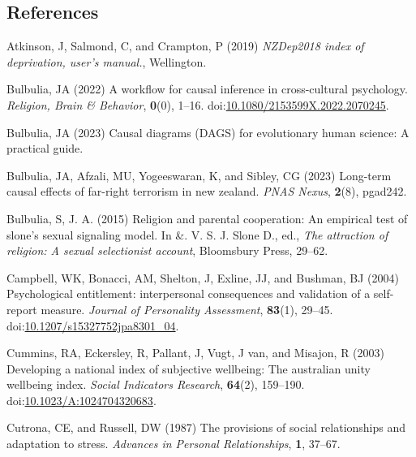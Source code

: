 \documentclass[
  singlecolumn,
  9pt]{article}
\newlength{\cslhangindent}
\newenvironment{CSLReferences}[2] %
 {\begin{list}{}{%
  \setlength{\itemindent}{0pt}
  \setlength{\leftmargin}{0pt}
  \setlength{\parsep}{0pt}
  \ifodd #1
   \setlength{\leftmargin}{\cslhangindent}
   \setlength{\itemindent}{-1\cslhangindent}
  \fi
  \setlength{\itemsep}{#2\baselineskip}}}
 {\end{list}}
\begin{document}
\newpage{}

\subsection*{References}\label{references}

\label{refs}
\begin{CSLReferences}{1}{0}
Atkinson, J, Salmond, C, and Crampton, P (2019) \emph{NZDep2018 index of
deprivation, user{'}s manual.}, Wellington.

Bulbulia, JA (2022) A workflow for causal inference in cross-cultural
psychology. \emph{Religion, Brain \& Behavior}, \textbf{0}(0), 1--16.
doi:\href{https://doi.org/10.1080/2153599X.2022.2070245}{10.1080/2153599X.2022.2070245}.

Bulbulia, JA (2023) Causal diagrams (DAGS) for evolutionary human
science: A practical guide.

Bulbulia, JA, Afzali, MU, Yogeeswaran, K, and Sibley, CG (2023)
Long-term causal effects of far-right terrorism in new zealand.
\emph{PNAS Nexus}, \textbf{2}(8), pgad242.

Bulbulia, S, J. A. (2015) Religion and parental cooperation: An
empirical test of slone's sexual signaling model. In \&. V. S. J. Slone
D., ed., \emph{The attraction of religion: A sexual selectionist
account}, Bloomsbury Press, 29--62.

Campbell, WK, Bonacci, AM, Shelton, J, Exline, JJ, and Bushman, BJ
(2004) Psychological entitlement: interpersonal consequences and
validation of a self-report measure. \emph{Journal of Personality
Assessment}, \textbf{83}(1), 29--45.
doi:\href{https://doi.org/10.1207/s15327752jpa8301_04}{10.1207/s15327752jpa8301\_04}.

Cummins, RA, Eckersley, R, Pallant, J, Vugt, J van, and Misajon, R
(2003) Developing a national index of subjective wellbeing: The
australian unity wellbeing index. \emph{Social Indicators Research},
\textbf{64}(2), 159--190.
doi:\href{https://doi.org/10.1023/A:1024704320683}{10.1023/A:1024704320683}.

Cutrona, CE, and Russell, DW (1987) The provisions of social
relationships and adaptation to stress. \emph{Advances in Personal
Relationships}, \textbf{1}, 37--67.


\end{CSLReferences}
\end{document}
